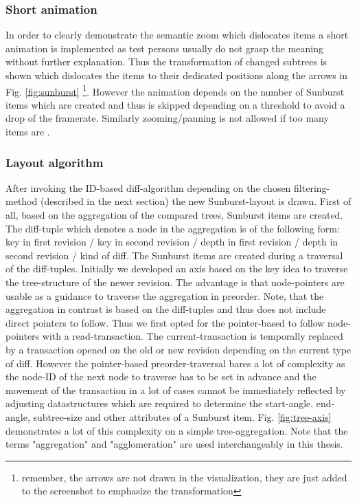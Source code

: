 \subsubsection{Short animation}
In order to clearly demonstrate the semantic zoom which dislocates items a short animation is implemented as test persons usually do not grasp the meaning without further explanation. Thus the transformation of changed subtrees is shown which dislocates the items to their dedicated positions along the arrows in Fig. \ref{fig:sunburst} \footnote{remember, the arrows are not drawn in the visualization, they are just added to the screenshot to emphasize the transformation}. However the animation depends on the number of Sunburst items which are created and thus is skipped depending on a threshold to avoid a drop of the framerate. Similarly zooming/panning is not allowed if too many items are .

\subsubsection{Layout algorithm}
After invoking the ID-based diff-algorithm depending on the chosen filtering-method (described in the next section) the new Sunburst-layout is drawn. First of all, based on the aggregation of the compared trees, Sunburst items are created. The diff-tuple which denotes a node in the aggregation is of the following form: key in first revision / key in second revision / depth in first revision / depth in second revision / kind of diff. The Sunburst items are created during a traversal of the diff-tuples. Initially we developed an axis based on the key idea to traverse the tree-structure of the newer revision. The advantage is that node-pointers are usable as a guidance to traverse the aggregation in preorder. Note, that the aggregation in contrast is based on the diff-tuples and thus does not include direct pointers to follow. Thus we first opted for the pointer-based to follow node-pointers with a read-transaction. The current-transaction is temporally replaced by a transaction opened on the old or new revision depending on the current type of diff. However the pointer-based preorder-traversal bares a lot of complexity as the node-ID of the next node to traverse has to be set in advance and the movement of the transaction in a lot of cases cannot be immediately reflected by adjusting datastructures which are required to determine the start-angle, end-angle, subtree-size and other attributes of a Sunburst item. Fig. \ref{fig:tree-axis} demonstrates a lot of this complexity on a simple tree-aggregation. Note that the terms "aggregation" and "agglomeration" are used interchangeably in this thesis. 

